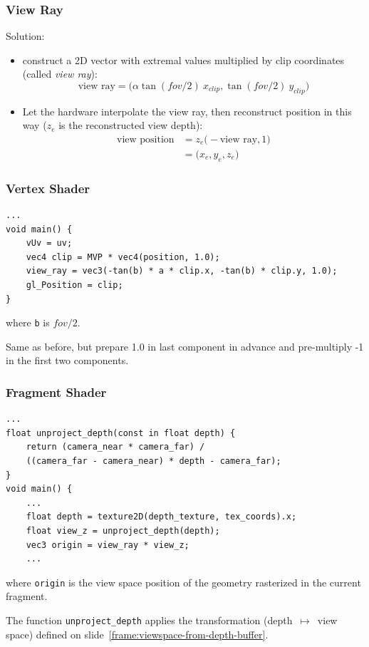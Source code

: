 \documentclass{beamer}
\begin{document}
\begin{frame}
\frametitle{View Ray}
Solution: 
\begin{itemize}
    \item construct a 2D vector with extremal values multiplied by clip coordinates (called \emph{view ray}):
    \[
    \text{view ray} = \bigl(\alpha \tan(fov/2)\:x_{clip}, \tan(fov/2)\:y_{clip}\bigr)
    \]
    \item Let the hardware interpolate the view ray, then reconstruct position in this way ($ z_e $ is the reconstructed view depth):
    \begin{align*}
    \text{view position} &= z_e \bigl(-\text{view ray}, 1\bigr)\\
                         &= \bigl( x_e, y_e, z_e \bigr)
    \end{align*}
\end{itemize}

\end{frame}

\begin{frame}[fragile]
\frametitle{Vertex Shader}
\begin{verbatim}
...
void main() {
    vUv = uv;
    vec4 clip = MVP * vec4(position, 1.0);
    view_ray = vec3(-tan(b) * a * clip.x, -tan(b) * clip.y, 1.0);
    gl_Position = clip;
}

\end{verbatim}
where \texttt{b} is $ fov/2 $.

Same as before, but prepare 1.0 in last component in advance and pre-multiply -1 in the first two components.
\end{frame}

\begin{frame}[fragile]
\frametitle{Fragment Shader}
\begin{verbatim}
...
float unproject_depth(const in float depth) {
    return (camera_near * camera_far) /
    ((camera_far - camera_near) * depth - camera_far);
}
void main() {
    ...
    float depth = texture2D(depth_texture, tex_coords).x;
    float view_z = unproject_depth(depth);
    vec3 origin = view_ray * view_z;
    ...
\end{verbatim}
where \texttt{origin} is the view space position of the geometry rasterized in the current fragment.

The function \texttt{unproject_depth} applies the transformation (depth~$ \mapsto $~view space) defined on slide~\ref{frame:viewspace-from-depth-buffer}.

\end{frame}
\end{document}
